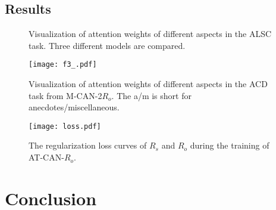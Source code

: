 \documentclass[11pt,a4paper]{article}
\begin{document}
\subsection{Results}


\begin{figure}
\setlength{\abovecaptionskip}{0.1cm}   %
\setlength{\belowcaptionskip}{-0.2cm}   %
\centering
{}
\vspace{-5pt}
\vspace{-5pt}
\caption{Visualization of attention weights of different aspects in the ALSC task. Three different models are compared.}
\label{compare-att}
\end{figure}


\begin{figure}
\setlength{\abovecaptionskip}{0.1cm}   %
\setlength{\belowcaptionskip}{-0.4cm}   %
\centering
\texttt{[image: f3\_.pdf]}
\caption{Visualization of attention weights of different aspects in the ACD task from M-CAN-2$R_o$. The a/m is short for anecdotes/miscellaneous.} 
  \label{ACD-att} 
\end{figure}


\begin{figure}
\setlength{\abovecaptionskip}{0.1cm}   %
\setlength{\belowcaptionskip}{-0.5cm}   %
\centering
\texttt{[image: loss.pdf]}
\caption{The regularization loss curves of $R_s$ and $R_o$ during the training of AT-CAN-$R_o$.} 
  \label{figure:reg-loss} 
\end{figure}

\section{Conclusion}
\end{document}
